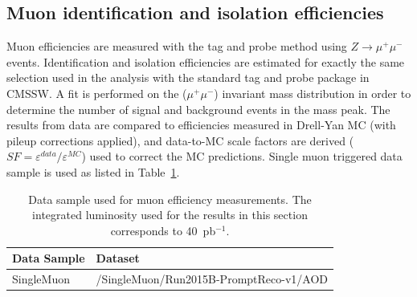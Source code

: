 \label{sec:muonEff}
\subsection{Muon identification and isolation efficiencies}
\label{sec:muonEff1}
Muon efficiencies are measured with the tag and probe method using
$Z\rightarrow\mu^{+}\mu^{-}$ events. Identification and isolation efficiencies are estimated for exactly the same selection used in the analysis with the standard tag and probe package in CMSSW. A fit is performed on the ($\mu^{+}\mu^{-}$) invariant mass distribution in order to determine the number of signal and background events in the mass peak. 
The results from data are compared to
efficiencies measured in Drell-Yan MC (with pileup corrections applied), and data-to-MC
scale factors are derived ($SF = \varepsilon^{data}/\varepsilon^{MC}$) used to correct the MC
predictions. Single muon triggered data sample is used as listed in Table~\ref{tab:samples}.


\begin{table}
\vspace{0.2cm}
\begin{center}
\begin{tabular}{l|l}
\hline
Data Sample & Dataset \\
\hline
\hline
SingleMuon     & /SingleMuon/Run2015B-PromptReco-v1/AOD \\
\hline
\end{tabular}
\caption{Data sample used for muon efficiency measurements. The integrated luminosity used for the results in this section corresponds to 40~pb$^{-1}$.}
\label{tab:samples}
\end{center}
\end{table}


